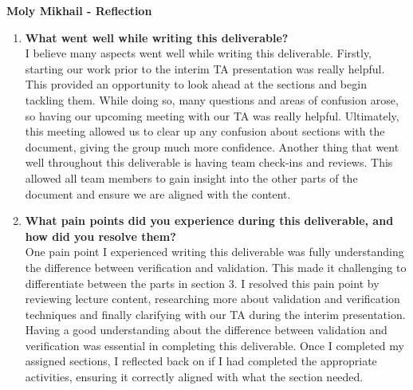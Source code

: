 \documentclass[12pt, titlepage]{article}
\begin{document}
\textbf{Moly Mikhail - Reflection}
\begin{enumerate}
  \item \textbf{What went well while writing this deliverable?}\\
    I believe many aspects went well while writing this deliverable.
    Firstly, starting our work prior to the interim TA presentation
    was really helpful.
    This provided an opportunity to look ahead at the sections and
    begin tackling them. While doing so, many questions and areas of
    confusion arose, so having our upcoming meeting with our TA was
    really helpful.
    Ultimately, this meeting allowed us to clear up any confusion
    about sections with the document, giving the group much more
    confidence. Another thing that went well throughout this
    deliverable is having team check-ins and reviews.
    This allowed all team members to gain insight into the other
    parts of the document and ensure we are aligned with the content.
  \item \textbf{What pain points did you experience during this
      deliverable, and how
    did you resolve them?}\\
    One pain point I experienced writing this deliverable was fully
    understanding the difference between verification and validation.
    This made it challenging to differentiate between the parts in section 3.
    I resolved this pain point by reviewing lecture content,
    researching more about validation and verification techniques and
    finally clarifying with our TA during the interim presentation.
    Having a good understanding about the difference between
    validation and verification was essential in completing this
    deliverable. Once I completed
    my assigned sections, I reflected back on if I had completed the
    appropriate activities, ensuring it correctly aligned with what
    the section needed.
\end{enumerate}
\end{document}
